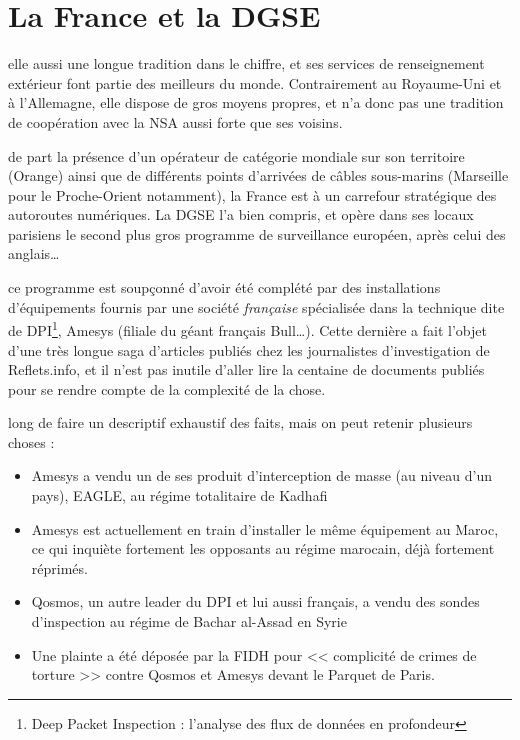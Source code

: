 \newpage
\section{La France et la DGSE}

 elle aussi une longue tradition dans le chiffre, et ses
services de renseignement extérieur font partie des meilleurs du monde.
Contrairement au Royaume-Uni et à l'Allemagne, elle dispose de gros moyens
propres, et n'a donc pas une tradition de coopération avec la NSA aussi forte
que ses voisins. 

 de part la présence d'un opérateur de catégorie mondiale
sur son territoire (Orange) ainsi que de différents points d'arrivées de câbles
sous-marins (Marseille pour le Proche-Orient notamment), la France est à un
carrefour stratégique des autoroutes numériques. La DGSE l'a bien compris, et
opère dans ses locaux parisiens le second plus gros programme de surveillance
européen, après celui des anglais\ldots\cite{DGSE}

 ce programme est soupçonné d'avoir été
complété par des installations\cite{reflets} d'équipements fournis par une
société \emph{française} spécialisée dans la technique dite de DPI\footnote{Deep
Packet Inspection :
l'analyse des flux de données en profondeur}, Amesys (filiale du géant français
Bull\ldots).
Cette dernière a fait l'objet d'une très longue saga d'articles publiés chez les journalistes d'investigation de
Reflets.info, et il n'est pas inutile d'aller lire la centaine de documents
publiés pour se rendre compte de la complexité de la chose.

 long de faire un descriptif exhaustif des faits,
mais on peut retenir plusieurs choses :

\begin{itemize}
  \item Amesys a vendu un de ses produit d'interception de masse (au niveau
  d'un pays), EAGLE, au régime totalitaire de Kadhafi\cite{libye}
  \item Amesys est actuellement en train d'installer le même équipement au
  Maroc\cite{maroc}, ce qui inquiète fortement les opposants au régime
  marocain, déjà fortement réprimés.
  \item Qosmos, un autre leader du DPI et lui aussi français, a vendu des
  sondes d'inspection au régime de Bachar al-Assad en Syrie\cite{qosmos}
  \item Une plainte a été déposée par la FIDH pour << complicité de crimes de
  torture >> contre Qosmos et Amesys devant le Parquet de Paris.\cite{fidh}
\end{itemize}

